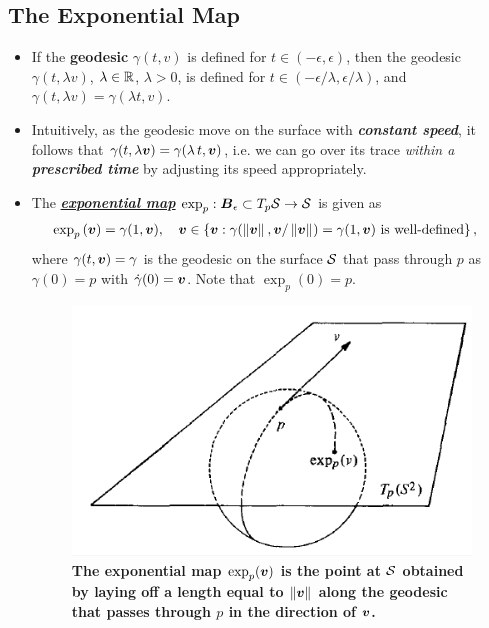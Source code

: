 \documentclass[11pt]{article}
\begin{document}
\subsection{The Exponential Map}
\begin{itemize}
\item \begin{lemma}
If the \textbf{geodesic} $\gamma(t, v)$ is defined for $t \in (-\epsilon, \epsilon)$, then the geodesic $\gamma(t, \lambda v)$, $\lambda \in {\mathbb R}$, $\lambda > 0$, is defined for $t \in  (-\epsilon/\lambda, \epsilon/\lambda)$, and $\gamma(t, \lambda v) = \gamma(\lambda t, v)$.
\end{lemma} 

\item Intuitively, as the geodesic move on the surface with \textbf{\emph{constant speed}}, it follows that $\gamma(t, \lambda\boldsymbol{v}) = \gamma(\lambda\,t, \boldsymbol{v})$, i.e. we can go over its trace \emph{within a \textbf{prescribed time}} by adjusting its speed appropriately. 

\item \begin{definition}
The \underline{\emph{\textbf{exponential map}}} $\exp_{p}: \boldsymbol{B}_{\epsilon}\subset T_{p}{\mathcal S} \rightarrow {\mathcal S}$ is given as 
\begin{align*}
\exp_{p}\left(\boldsymbol{v}\right) &= \gamma(1, \boldsymbol{v}), \quad \boldsymbol{v} \in \left\{\boldsymbol{v}: \gamma(\left\|\boldsymbol{v}\right\|_{}, \boldsymbol{v}/\left\|\boldsymbol{v}\right\|_{})=\gamma(1, \boldsymbol{v})\text{ is well-defined}\right\},
\end{align*}
where $\gamma(t, \boldsymbol{v}) = \gamma$ is the geodesic on the surface ${\mathcal S}$ that pass through $p$ as $\gamma(0) = p$ with $\dot{\gamma}(0) = \boldsymbol{v}$. Note that $\exp_{p}(0) = p$.
\end{definition}

\begin{figure}[htb]
\centering
\begin{minipage}{0.6\linewidth}
 \centerline{\includegraphics[scale = 0.43]{exp_map.png}}
\end{minipage}
\caption{\scriptsize
\textbf{The exponential map $\exp_{p}(\boldsymbol{v})$ is the point at ${\mathcal S}$ obtained by laying off a length equal to $\left\|\boldsymbol{v}\right\|_{}$ along the geodesic that passes through $p$ in the direction of $\boldsymbol{v}$.  }}
\end{figure} 


\end{itemize}
\end{document}
